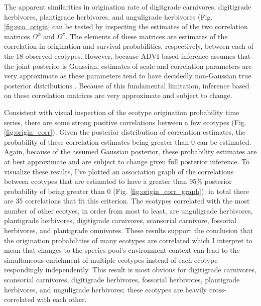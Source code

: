 The apparent similarities in origination rate of digitgrade carnivores, digitigrade herbivores, plantigrade herbivores, and unguligrade herbivores (Fig. \ref{fig:eco_origin} can be tested by inspecting the estimates of the two correlation matrices \(\Omega^{\phi}\) and \(\Omega^{\pi}\). The elements of these matrices are estimates of the correlation in origination and survival probabilities, respectively, between each of the 18 observed ecotypes. However, because ADVI-based inference assumes that the joint posterior is Gaussian, estimates of scale and correlation parameters are very approximate as these parameters tend to have decidedly non-Gaussian true posterior distributions \citep{Gelman2013d}. Because of this fundamental limitation, inference based on these correlation matrices are very approximate and subject to change.

Consistent with visual inspection of the ecotype origination probability time series, there are some strong positive correlations between a few ecotypes (Fig. \ref{fig:origin_corr}). Given the posterior distribution of correlation estimates, the probability of these correlation estimates being greater than 0 can be estimated. Again, because of the assumed Gaussian posterior, these probability estimates are at best approximate and are subject to change given full posterior inference. To visualize these results, I've plotted an association graph of the correlations between ecotypes that are estimated to have a greater than 95\% posterior probability of being greater than 0 (Fig. \ref{fig:origin_corr_graph}); in total there are 35 correlations that fit this criterion. The ecotypes correlated with the most number of other ecotyes, in order from most to least, are unguligrade herbivores, plantigrade herbivores, digitigrade carnivores, scansorial carnivore, fossorial herbivores, and plantigrade omnivores. These results support the conclusion that the origination probabilities of many ecotypes are correlated which I interpret to mean that changes to the species pool's environment context can lead to the simultaneous enrichment of multiple ecotypes instead of each ecotype respondingly independently. This result is most obvious for digitigrade carnivores, scansorial carnivores, digitigrade herbivores, fossorial herbivores, plantigrade herbivores, and unguligrade herbivores; these ecotypes are heavily cross-correlated with each other.

